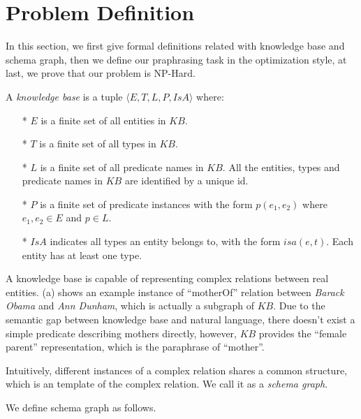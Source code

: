 \section{Problem Definition}
\label{sec:problem}

In this section, we first give formal definitions related with knowledge base
and schema graph, then we define our praphrasing task in the optimization style,
at last, we prove that our problem is NP-Hard.

\begin{definition}
A {\em knowledge base} is a tuple $\langle E, T, L, P, IsA \rangle$ where:
\begin{itemize}
  \item[*] $E$ is a finite set of all entities in $KB$.
  \item[*] $T$ is a finite set of all types in $KB$.
  \item[*] $L$ is a finite set of all predicate names in $KB$.
  All the entities, types and predicate names in $KB$ are identified by a unique id.
  \item[*] $P$ is a finite set of predicate instances with the form
  $p(e_1, e_2)$ where $e_1, e_2 \in E$ and $p \in L$.
  \item[*] $IsA$ indicates all types an entity belongs to, with the form $isa(e, t)$.
  Each entity has at least one type.
\end{itemize}
\end{definition}


A knowledge base is capable of representing complex relations between real entities.
(a) shows an example instance of ``motherOf'' relation between
\textit{Barack Obama} and \textit{Ann Dunham}, which is actually a subgraph of $KB$.
Due to the semantic gap between knowledge base and natural language, there doesn't
exist a simple predicate describing mothers directly, however, $KB$ provides the
 ``female parent'' representation, which is the paraphrase of ``mother''.

Intuitively, different instances of a complex relation shares a common structure,
which is an template of the complex relation. We call it as a \textit{schema graph}.

We define schema graph as follows.


